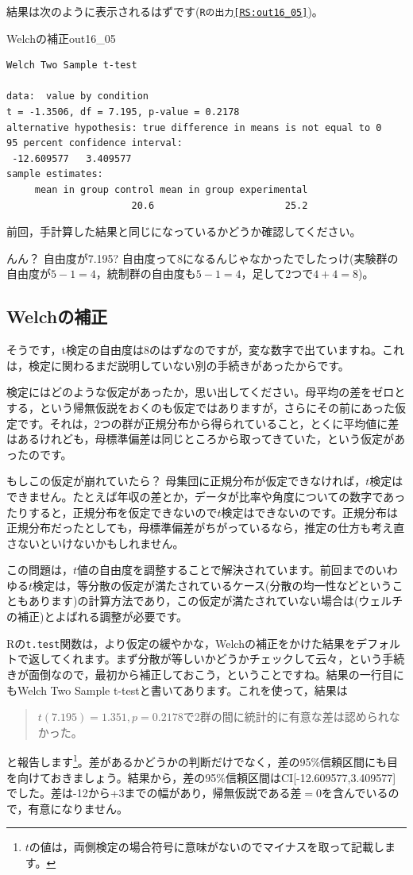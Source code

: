 \documentclass{ltjsbook}
\begin{document}
結果は次のように表示されるはずです(\texttt{Rの出力\ref{RS:out16_05}})。
\begin{Rscreen}{Welchの補正}{out16_05}
	\begin{verbatim}
Welch Two Sample t-test

data:  value by condition
t = -1.3506, df = 7.195, p-value = 0.2178
alternative hypothesis: true difference in means is not equal to 0
95 percent confidence interval:
 -12.609577   3.409577
sample estimates:
     mean in group control mean in group experimental 
                      20.6                       25.2 
\end{verbatim}
\end{Rscreen}
前回，手計算した結果と同じになっているかどうか確認してください。

んん？ 自由度が7.195? 自由度って8になるんじゃなかったでしたっけ(実験群の自由度が$5-1=4$，統制群の自由度も$5-1=4$，足して2つで$4+4=8$)。

\subsection{Welchの補正}
そうです，t検定の自由度は$8$のはずなのですが，変な数字で出ていますね。これは，検定に関わるまだ説明していない別の手続きがあったからです。

検定にはどのような仮定があったか，思い出してください。母平均の差をゼロとする，という帰無仮説をおくのも仮定ではありますが，さらにその前にあった仮定です。それは，2つの群が正規分布から得られていること，とくに平均値に差はあるけれども，母標準偏差は同じところから取ってきていた，という仮定があったのです。

もしこの仮定が崩れていたら？ 母集団に正規分布が仮定できなければ，$t$検定はできません。たとえば年収の差とか，データが比率や角度についての数字であったりすると，正規分布を仮定できないので$t$検定はできないのです。正規分布は正規分布だったとしても，母標準偏差がちがっているなら，推定の仕方も考え直さないといけないかもしれません。

この問題は，$t$値の自由度を調整することで解決されています。前回までのいわゆる$t$検定は，等分散の仮定が満たされているケース(分散の均一性などということもあります)の計算方法であり，この仮定が満たされていない場合は(ウェルチの補正)とよばれる調整が必要です。

Rの\texttt{t.test}関数は，より仮定の緩やかな，Welchの補正をかけた結果をデフォルトで返してくれます。まず分散が等しいかどうかチェックして云々，という手続きが面倒なので，最初から補正しておこう，ということですね。結果の一行目にもWelch Two Sample t-testと書いてあります。これを使って，結果は
\begin{quote}
	$t(7.195)=1.351,p = 0.2178$で2群の間に統計的に有意な差は認められなかった。
\end{quote}
と報告します\footnote{$t$の値は，両側検定の場合符号に意味がないのでマイナスを取って記載します。}。差があるかどうかの判断だけでなく，差の95\%信頼区間にも目を向けておきましょう。結果から，差の95\%信頼区間はCI[-12.609577,3.409577]でした。差は-12から+3までの幅があり，帰無仮説である差$=0$を含んでいるので，有意になりません。
\end{document}
